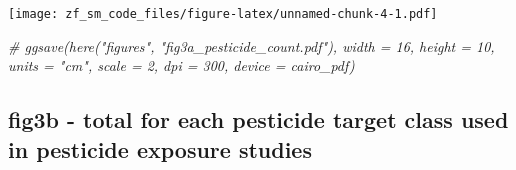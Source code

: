 \documentclass[
]{article}
\newenvironment{Shaded}{\begin{snugshade}}{\end{snugshade}}
\newcommand{\CommentTok}[1]{\textcolor[rgb]{0.56,0.35,0.01}{\textit{#1}}}
\begin{document}
\texttt{[image: zf\_sm\_code\_files/figure-latex/unnamed-chunk-4-1.pdf]}

\begin{Shaded}
\begin{Highlighting}[]
\CommentTok{\# ggsave(here("figures", "fig3a\_pesticide\_count.pdf"), width = 16, height = 10, units = "cm", scale = 2, dpi = 300, device = cairo\_pdf)}
\end{Highlighting}
\end{Shaded}

\hypertarget{fig3b---total-for-each-pesticide-target-class-used-in-pesticide-exposure-studies}{%
\subsection{fig3b - total for each pesticide target class used in
pesticide exposure
studies}\label{fig3b---total-for-each-pesticide-target-class-used-in-pesticide-exposure-studies}}
\end{document}
